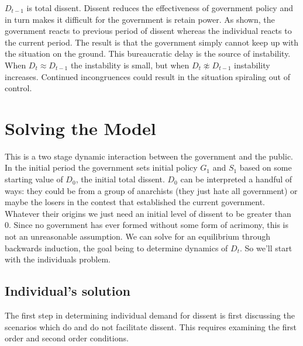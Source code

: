 \documentclass[12pt]{article}
\begin{document}
\begin{spacing}{1.5}
$D_{t-1}$ is total dissent. Dissent reduces the effectiveness of government policy and in turn makes it difficult for the government is retain power. As shown, the government reacts to previous period of dissent whereas the individual reacts to the current period. The result is that the government simply cannot keep up with the situation on the ground. This bureaucratic delay is the source of instability. When $D_t \approx D_{t-1}$ the instability is small, but when $D_t \not\approx D_{t-1}$ instability increases. Continued incongruences could result in the situation spiraling out of control. 



\section{Solving the Model}

This is a two stage dynamic interaction between the government and the public. In the initial period the government sets initial policy $G_1$ and $S_1$ based on some starting value of $D_0$, the initial total dissent. $D_0$ can be interpreted a handful of ways: they could be from a group of anarchists (they just hate all government) or maybe the losers in the contest that established the current government. Whatever their origins we just need an initial level of dissent to be greater than 0. Since no government has ever formed without some form of acrimony, this is not an unreasonable assumption. We can solve for an equilibrium through backwards induction, the goal being to determine dynamics of $D_t$. So we'll start with the individuals problem. 

\subsection{Individual's solution}


The first step in determining individual demand for dissent is first discussing the scenarios which do and do not facilitate dissent. This requires examining the first order and second order conditions.  


\end{spacing}
\end{document}
